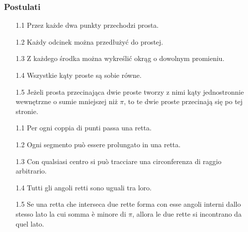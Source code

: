 \subsubsection{Postulati} %
\begin{enumerate}
    \item [1.1] Przez każde dwa punkty przechodzi prosta. %
    \item [1.2] Każdy odcinek można przedłużyć do prostej. %
    \item [1.3] Z każdego środka można wykreślić okrąg o dowolnym promieniu. %
    \item [1.4] Wszystkie kąty proste są sobie równe. %
    \item [1.5] Jeżeli prosta przecinająca dwie proste tworzy z nimi kąty jednostronnie wewnętrzne o sumie mniejszej niż $\pi$, to te dwie proste przecinają się po tej stronie. %
    \item [1.1] Per ogni coppia di punti passa una retta. %
    \item [1.2] Ogni segmento può essere prolungato in una retta. %
    \item [1.3] Con qualsiasi centro si può tracciare una circonferenza di raggio arbitrario. %
    \item [1.4] Tutti gli angoli retti sono uguali tra loro. %
    \item [1.5] Se una retta che interseca due rette forma con esse angoli interni dallo stesso lato la cui somma è minore di $\pi$, allora le due rette si incontrano da quel lato. %
\end{enumerate}

